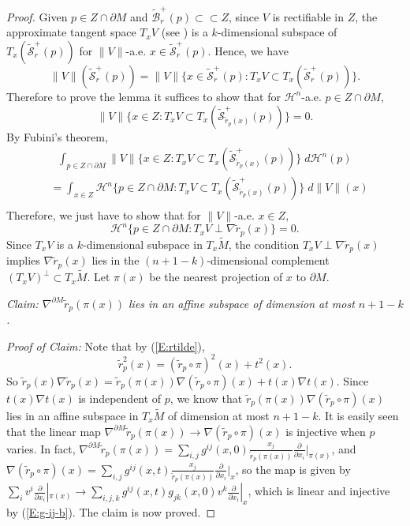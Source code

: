 \documentclass[10pt]{amsart}
\theoremstyle{definition}
\theoremstyle{remark}
\numberwithin{equation}{section}
\newcommand{\mH}{\mathcal{H}}
\newcommand{\tM}{\widetilde{M}}
\newcommand{\tBcal}{\widetilde{\mathcal{B}}}
\newcommand{\tScal}{\widetilde{\mathcal{S}}}
\newcommand{\tir}{\widetilde{r}}
\begin{document}
\begin{proof}
Given $p\in Z\cap \partial M$ and $\tBcal^+_r(p) \subset \subset Z$, since $V$ is rectifiable in $Z$, the approximate tangent space $T_x V$ (see \cite[15.3]{Simon}) is a $k$-dimensional subspace of $T_x(\tScal^+_r(p))$ for $\|V\|$-a.e. $x\in  \tScal^+_r(p)$. Hence, we have
\[ \|V\|(\tScal^+_r(p))=\|V\|\{x\in \tScal^+_r(p) : T_x V \subset T_x(\tScal^+_r(p))\}.\]
Therefore to prove the lemma it suffices to show that for $\mathcal{H}^n$-a.e. $p \in Z \cap \partial M$,
\[ \|V\|\{x\in Z :  T_xV\subset T_x (\tScal^+_{\tir_p(x)}(p))\}=0.\]
By Fubini's theorem,
\begin{displaymath}
\begin{split}
&\ \ \ \int_{p\in Z\cap\partial M}\|V\|\{x\in Z :  T_xV\subset T_x (\tScal^+_{\tir_p(x)}(p))\} \; d\mH^n(p)\\
&=\int_{x\in Z}\mH^n \{p\in Z\cap\partial M :T_xV\subset T_x (\tScal^+_{\tir_p(x)}(p))\} \; d\|V\|(x)\\
\end{split}
\end{displaymath}
Therefore, we just have to show that for $\|V\|$-a.e. $x\in Z$, 
\begin{equation}
\label{E:measure-zero}
\mH^n\{p\in Z\cap\partial M :  T_xV \perp \nabla \tir_p(x)\}=0.
\end{equation}
Since $T_xV$ is a $k$-dimensional subspace in $T_x \tM$, the condition $T_xV\perp \nabla \tir_p(x)$ implies $\nabla \tir_p(x)$ lies in the $(n+1-k)$-dimensional complement $(T_x V)^{\perp} \subset T_x \tM$. Let $\pi(x)$ be the nearest projection of $x$ to $\partial M$. 

\vspace{0.3cm}
\textit{Claim: $\nabla^{\partial M} \tir_p (\pi(x))$ lies in an affine subspace of dimension at most $n+1-k$.}

\textit{Proof of Claim:} Note that by (\ref{E:rtilde}), 
\[ \tir_p^2(x)=(\tir_p\circ\pi)^2(x)+t^2(x). \] 
So $\tir_p(x)\nabla \tir_p(x)=\tir_p(\pi(x))\nabla (\tir_p\circ\pi)(x)+t(x)\nabla t(x)$. Since $t(x)\nabla t(x)$ is independent of $p$, we know that $\tir_p(\pi(x))\nabla (\tir_p\circ\pi)(x)$ lies in an affine subspace in $T_x\tM$ of dimension at most $n+1-k$. It is easily seen that the linear map $\nabla^{\partial M} \tir_p (\pi(x))\to \nabla (\tir_p\circ\pi)(x)$ is injective when $p$ varies. In fact, $\nabla^{\partial M} \tir_p (\pi(x))=\sum_{i, j}g^{ij}(x, 0)\frac{x_j}{\tir_p(\pi(x))}\frac{\partial}{\partial x_i}|_{\pi(x)}$, and $\nabla (\tir_p\circ\pi)(x)=\sum_{i, j}g^{ij}(x, t)\frac{x_j}{\tir_p(\pi(x))}\frac{\partial}{\partial x_i}|_{x}$, so the map is given by $\sum_{i}v^i\frac{\partial}{\partial x_i}|_{\pi(x)}\to \sum_{i, j, k}g^{ij}(x, t)g_{jk}(x, 0)v^k\frac{\partial}{\partial x_i}|_{x}$, which is linear and injective by (\ref{E:g-ij-b}). The claim is now proved.


\end{proof}
\end{document}
